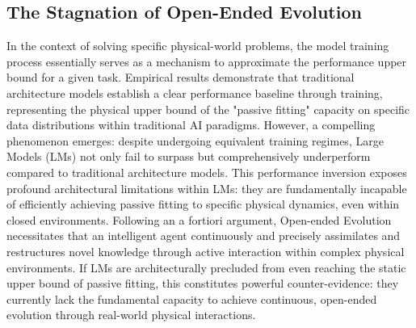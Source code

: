 


\subsection{The Stagnation of Open-Ended Evolution}
In the context of solving specific physical-world problems, the model training process essentially serves as a mechanism to approximate the performance upper bound for a given task. Empirical results demonstrate that traditional architecture models establish a clear performance baseline through training, representing the physical upper bound of the "passive fitting" capacity on specific data distributions within traditional AI paradigms. However, a compelling phenomenon emerges: despite undergoing equivalent training regimes, Large Models (LMs) not only fail to surpass but comprehensively underperform compared to traditional architecture models. This performance inversion exposes profound architectural limitations within LMs: they are fundamentally incapable of efficiently achieving passive fitting to specific physical dynamics, even within closed environments. Following an a fortiori argument, Open-ended Evolution necessitates that an intelligent agent continuously and precisely assimilates and restructures novel knowledge through active interaction within complex physical environments. If LMs are architecturally precluded from even reaching the static upper bound of passive fitting, this constitutes powerful counter-evidence: they currently lack the fundamental capacity to achieve continuous, open-ended evolution through real-world physical interactions.









